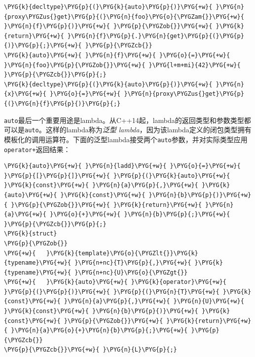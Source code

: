 
\begin{codeblockbg}
\begin{Verbatim}[commandchars=\\\{\},breaklines=true,breakanywhere=true,fontsize=\codefont,xleftmargin=17bp]
\PYG{k}{decltype}\PYG{p}{(}\PYG{k}{auto}\PYG{p}{)}\PYG{+w}{ }\PYG{n}{proxy\PYGZus{}get}\PYG{p}{(}\PYG{n}{foo}\PYG{o}{\PYGZam{}}\PYG{+w}{ }\PYG{n}{f}\PYG{p}{)}\PYG{+w}{ }\PYG{p}{\PYGZob{}}\PYG{+w}{ }\PYG{k}{return}\PYG{+w}{ }\PYG{n}{f}\PYG{p}{.}\PYG{n}{get}\PYG{p}{(}\PYG{p}{)}\PYG{p}{;}\PYG{+w}{ }\PYG{p}{\PYGZcb{}}
\PYG{k}{auto}\PYG{+w}{ }\PYG{n}{f}\PYG{+w}{ }\PYG{o}{=}\PYG{+w}{ }\PYG{n}{foo}\PYG{p}{\PYGZob{}}\PYG{+w}{ }\PYG{l+m+mi}{42}\PYG{+w}{ }\PYG{p}{\PYGZcb{}}\PYG{p}{;}
\PYG{k}{decltype}\PYG{p}{(}\PYG{k}{auto}\PYG{p}{)}\PYG{+w}{ }\PYG{n}{x}\PYG{+w}{ }\PYG{o}{=}\PYG{+w}{ }\PYG{n}{proxy\PYGZus{}get}\PYG{p}{(}\PYG{n}{f}\PYG{p}{)}\PYG{p}{;}
\end{Verbatim}
\end{codeblockbg}



\texttt{auto}最后一个重要用途是lambda。从C++14起，lambda的返回类型和参数类型都可以是\texttt{auto}。这样的lambda称为\textit{泛型} \textit{lambda}，因为该lambda定义的闭包类型拥有模板化的调用运算符。下面的泛型lambda接受两个\texttt{auto}参数，并对实际类型应用\texttt{operator+}返回结果：



\begin{codeblockbg}
\begin{Verbatim}[commandchars=\\\{\},breaklines=true,breakanywhere=true,fontsize=\codefont,xleftmargin=17bp]
\PYG{k}{auto}\PYG{+w}{ }\PYG{n}{ladd}\PYG{+w}{ }\PYG{o}{=}\PYG{+w}{ }\PYG{p}{[}\PYG{p}{]}\PYG{+w}{ }\PYG{p}{(}\PYG{k}{auto}\PYG{+w}{ }\PYG{k}{const}\PYG{+w}{ }\PYG{n}{a}\PYG{p}{,}\PYG{+w}{ }\PYG{k}{auto}\PYG{+w}{ }\PYG{k}{const}\PYG{+w}{ }\PYG{n}{b}\PYG{p}{)}\PYG{+w}{ }\PYG{p}{\PYGZob{}}\PYG{+w}{ }\PYG{k}{return}\PYG{+w}{ }\PYG{n}{a}\PYG{+w}{ }\PYG{o}{+}\PYG{+w}{ }\PYG{n}{b}\PYG{p}{;}\PYG{+w}{ }\PYG{p}{\PYGZcb{}}\PYG{p}{;}
\PYG{k}{struct}
\PYG{p}{\PYGZob{}}
\PYG{+w}{   }\PYG{k}{template}\PYG{o}{\PYGZlt{}}\PYG{k}{typename}\PYG{+w}{ }\PYG{n+nc}{T}\PYG{p}{,}\PYG{+w}{ }\PYG{k}{typename}\PYG{+w}{ }\PYG{n+nc}{U}\PYG{o}{\PYGZgt{}}
\PYG{+w}{   }\PYG{k}{auto}\PYG{+w}{ }\PYG{k}{operator}\PYG{+w}{ }\PYG{p}{(}\PYG{p}{)}\PYG{+w}{ }\PYG{p}{(}\PYG{n}{T}\PYG{+w}{ }\PYG{k}{const}\PYG{+w}{ }\PYG{n}{a}\PYG{p}{,}\PYG{+w}{ }\PYG{n}{U}\PYG{+w}{ }\PYG{k}{const}\PYG{+w}{ }\PYG{n}{b}\PYG{p}{)}\PYG{+w}{ }\PYG{k}{const}\PYG{+w}{ }\PYG{p}{\PYGZob{}}\PYG{+w}{ }\PYG{k}{return}\PYG{+w}{ }\PYG{n}{a}\PYG{o}{+}\PYG{n}{b}\PYG{p}{;}\PYG{+w}{ }\PYG{p}{\PYGZcb{}}
\PYG{p}{\PYGZcb{}}\PYG{+w}{ }\PYG{n}{L}\PYG{p}{;}
\end{Verbatim}
\end{codeblockbg}



